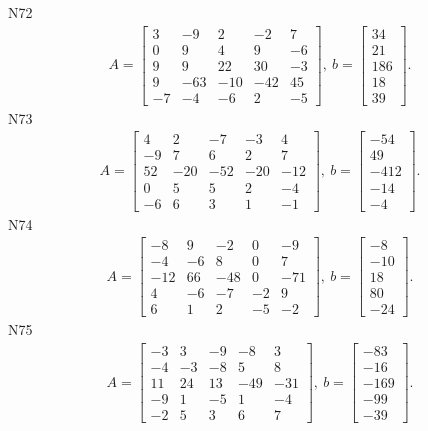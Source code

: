 \documentclass[11pt]{report}
\begin{document}
N72
\begin{align*}
 A = \left[\begin{matrix}3 & -9 & 2 & -2 & 7\\0 & 9 & 4 & 9 & -6\\9 & 9 & 22 & 30 & -3\\9 & -63 & -10 & -42 & 45\\-7 & -4 & -6 & 2 & -5\end{matrix}\right],
\ b = \left[\begin{matrix}34\\21\\186\\18\\39\end{matrix}\right]. 
 \end{align*}
N73
\begin{align*}
 A = \left[\begin{matrix}4 & 2 & -7 & -3 & 4\\-9 & 7 & 6 & 2 & 7\\52 & -20 & -52 & -20 & -12\\0 & 5 & 5 & 2 & -4\\-6 & 6 & 3 & 1 & -1\end{matrix}\right],
\ b = \left[\begin{matrix}-54\\49\\-412\\-14\\-4\end{matrix}\right]. 
 \end{align*}
N74
\begin{align*}
 A = \left[\begin{matrix}-8 & 9 & -2 & 0 & -9\\-4 & -6 & 8 & 0 & 7\\-12 & 66 & -48 & 0 & -71\\4 & -6 & -7 & -2 & 9\\6 & 1 & 2 & -5 & -2\end{matrix}\right],
\ b = \left[\begin{matrix}-8\\-10\\18\\80\\-24\end{matrix}\right]. 
 \end{align*}
N75
\begin{align*}
 A = \left[\begin{matrix}-3 & 3 & -9 & -8 & 3\\-4 & -3 & -8 & 5 & 8\\11 & 24 & 13 & -49 & -31\\-9 & 1 & -5 & 1 & -4\\-2 & 5 & 3 & 6 & 7\end{matrix}\right],
\ b = \left[\begin{matrix}-83\\-16\\-169\\-99\\-39\end{matrix}\right]. 
 \end{align*}
\end{document}
